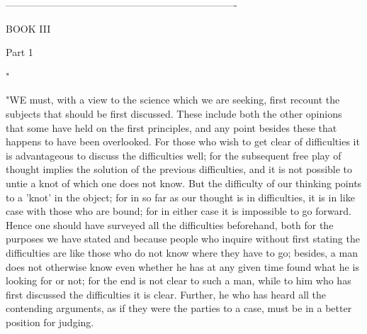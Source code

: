 ----------------------------------------------------------------------

BOOK III

Part 1 

"

"WE must, with a view to the science which we are seeking, first recount
the subjects that should be first discussed. These include both the
other opinions that some have held on the first principles, and any
point besides these that happens to have been overlooked. For those
who wish to get clear of difficulties it is advantageous to discuss
the difficulties well; for the subsequent free play of thought implies
the solution of the previous difficulties, and it is not possible
to untie a knot of which one does not know. But the difficulty of
our thinking points to a 'knot' in the object; for in so far as our
thought is in difficulties, it is in like case with those who are
bound; for in either case it is impossible to go forward. Hence one
should have surveyed all the difficulties beforehand, both for the
purposes we have stated and because people who inquire without first
stating the difficulties are like those who do not know where they
have to go; besides, a man does not otherwise know even whether he
has at any given time found what he is looking for or not; for the
end is not clear to such a man, while to him who has first discussed
the difficulties it is clear. Further, he who has heard all the contending
arguments, as if they were the parties to a case, must be in a better
position for judging. 

